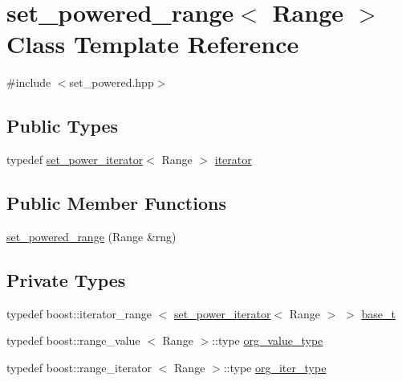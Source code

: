 \hypertarget{classyuh_1_1range__detail_1_1set__powered__range}{\section{set\-\_\-powered\-\_\-range$<$ \-Range $>$ \-Class \-Template \-Reference}
\label{df/db5/classyuh_1_1range__detail_1_1set__powered__range}
}


{\ttfamily \#include $<$set\-\_\-powered.\-hpp$>$}

\subsection*{\-Public \-Types}
\begin{DoxyCompactItemize}
\item 
typedef \hyperlink{classyuh_1_1range__detail_1_1set__power__iterator}{set\-\_\-power\-\_\-iterator}$<$ \-Range $>$ \hyperlink{classyuh_1_1range__detail_1_1set__powered__range_afd07d63ef4b23b42b911b7a03f982529}{iterator}
\end{DoxyCompactItemize}
\subsection*{\-Public \-Member \-Functions}
\begin{DoxyCompactItemize}
\item 
\hyperlink{classyuh_1_1range__detail_1_1set__powered__range_adb4dadd9496170299e6329c79a4603d1}{set\-\_\-powered\-\_\-range} (\-Range \&rng)
\end{DoxyCompactItemize}
\subsection*{\-Private \-Types}
\begin{DoxyCompactItemize}
\item 
typedef boost\-::iterator\-\_\-range\*
$<$ \hyperlink{classyuh_1_1range__detail_1_1set__power__iterator}{set\-\_\-power\-\_\-iterator}$<$ \-Range $>$ $>$ \hyperlink{classyuh_1_1range__detail_1_1set__powered__range_acdc8cc49179ebf63d25a40ae97f01984}{base\-\_\-t}
\item 
typedef boost\-::range\-\_\-value\*
$<$ \-Range $>$\-::type \hyperlink{classyuh_1_1range__detail_1_1set__powered__range_a69559cacbf423e64c6efb8e1644ea37e}{org\-\_\-value\-\_\-type}
\item 
typedef boost\-::range\-\_\-iterator\*
$<$ \-Range $>$\-::type \hyperlink{classyuh_1_1range__detail_1_1set__powered__range_a7d85ad9a5f85d7a869dd7ea9557eee8b}{org\-\_\-iter\-\_\-type}
\end{DoxyCompactItemize}


